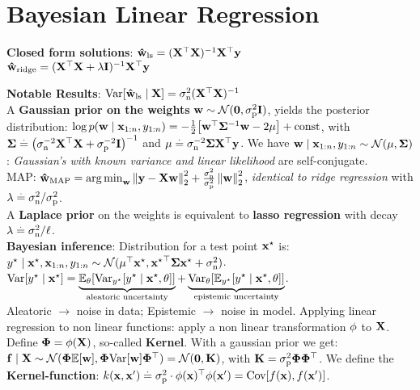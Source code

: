\section{Bayesian Linear Regression}
\begin{framed}
    \textbf{Closed form solutions}:
    $\vwhat_{\ls} = \inv{(\transpose{\mX} \mX)} \transpose{\mX} \vy$  \\
    $\vwhat_{\ridge} = \inv{(\transpose{\mX} \mX + \lambda \mI)} \transpose{\mX} \vy$
\end{framed}
\textbf{Notable Results}: $\Var{\vwhat_{\ls} \mid \rX} = \sigman^2(\transpose{\rX}\rX)^{-1}$ \\
A \textbf{Gaussian prior on the weights} $\vw \sim \N{\vzero}{\sigmap^2 \mI}$, yields the posterior distribution: $\log p(\vw \mid \vx_{1:n}, y_{1:n}) = -\frac{1}{2} \brackets*{\transpose{\vw}\mSigma^{-1}\vw - 2\vmu} + \const$, with $\mSigma \defeq \inv{\parentheses*{\sigman^{-2} \transpose{\mX} \mX + \sigmap^{-2} \mI}}$ and $\vmu \defeq \sigman^{-2} \mSigma \transpose{\mX} \vy$. We have $\vw \mid \vx_{1:n}, y_{1:n} \sim \N{\vmu}{\mSigma}$: \textit{Gaussian's with known variance and linear likelihood} are self-conjugate. \\
MAP: $\vwhat_\MAP = \argmin_\vw \norm{\vy - \mX \vw}_2^2 + \frac{\sigman^2}{\sigmap^2} \norm{\vw}_2^2$, \textit{identical to ridge regression} with $\lambda \defeq \sigman^2 / \sigmap^2$. \\
A \textbf{Laplace prior} on the weights is equivalent to \textbf{lasso regression} with decay ${\lambda \defeq \sigman^2 / \ell}$. \\
\textbf{Bayesian inference}: Distribution for a test point $\vxs$ is: $\ys \mid \vxs, \vx_{1:n}, y_{1:n} \sim \N{\transpose{\vmu} \vxs}{\transpose{\vxs} \mSigma \vxs + \sigman^2}$. \\
$\Var{\ys \mid \vxs} = \underbrace{\E[\vtheta]{\Var[\ys]{\ys \mid \vxs, \vtheta}}}_{\text{aleatoric uncertainty}} + \underbrace{\Var[\vtheta]{\E[\ys]{\ys \mid \vxs, \vtheta}}}_{\text{epistemic uncertainty}}$.\\
Aleatoric $\rightarrow$ noise in data; Epistemic $\rightarrow$ noise in model.
Applying linear regression to non linear functions: apply a non linear transformation $\vphi$ to $\rX$. Define $\mPhi = \vphi(\rX)$, so-called \textbf{Kernel}. With a gaussian prior we get: $\vf \mid \mX \sim \N{\mPhi \E{\vw}}{\mPhi \Var{\vw} \transpose{\mPhi}} = \N{\vzero}{\mK}$, with $\mK = \sigmap^2 \mPhi \transpose{\mPhi}$. We define the \textbf{Kernel-function}: $k(\vx, \vxp) \defeq \sigmap^2 \cdot \transpose{\vphi(\vx)} \vphi(\vxp) = \Cov{f(\vx), f(\vxp)}$.
